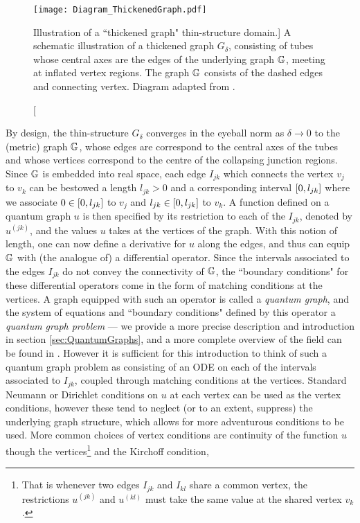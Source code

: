 \begin{figure}[t]
	\centering
	\texttt{[image: Diagram\_ThickenedGraph.pdf]}
	\caption[Illustration of a ``thickened graph" thin-structure domain.]{\label{fig:Diagram_ThickenedGraph} A schematic illustration of a thickened graph $G_{\delta}$, consisting of tubes whose central axes are the edges of the underlying graph $\mathbb{G}$, meeting at inflated vertex regions. The graph $\mathbb{G}$ consists of the dashed edges and connecting vertex. Diagram adapted from \cite[Figure 1]{exner2005convergence}.}
\end{figure}

By design, the thin-structure $G_{\delta}$ converges in the eyeball norm as $\delta\rightarrow0$ to the (metric) graph $\mathbb{G}$, whose edges are correspond to the central axes of the tubes and whose vertices correspond to the centre of the collapsing junction regions.
Since $\mathbb{G}$ is embedded into real space, each edge $I_{jk}$ which connects the vertex $v_j$ to $v_k$ can be bestowed a length $l_{jk}>0$ and a corresponding interval $\left[ 0,l_{jk} \right]$ where we associate $0\in\left[ 0,l_{jk} \right]$ to $v_j$ and $l_{jk}\in\left[ 0,l_{jk} \right]$ to $v_k$.
A function defined on a quantum graph $u$ is then specified by its restriction to each of the $I_{jk}$, denoted by $u^{(jk)}$, and the values $u$ takes at the vertices of the graph.
With this notion of length, one can now define a derivative for $u$ along the edges, and thus can equip $\mathbb{G}$ with (the analogue of) a differential operator.
Since the intervals associated to the edges $I_{jk}$ do not convey the connectivity of $\mathbb{G}$, the ``boundary conditions" for these differential operators come in the form of matching conditions at the vertices.
A graph equipped with such an operator is called a \emph{quantum graph}, and the system of equations and ``boundary conditions" defined by this operator a \emph{quantum graph problem} --- we provide a more precise description and introduction in section \ref{sec:QuantumGraphs}, and a more complete overview of the field can be found in \cite{berkolaiko2013introduction}.
However it is sufficient for this introduction to think of such a quantum graph problem as consisting of an ODE on each of the intervals associated to $I_{jk}$, coupled through matching conditions at the vertices.
Standard Neumann or Dirichlet conditions on $u$ at each vertex can be used as the vertex conditions, however these tend to neglect (or to an extent, suppress) the underlying graph structure, which allows for more adventurous conditions to be used.
More common choices of vertex conditions are continuity of the function $u$ though the vertices\footnote{That is whenever two edges $I_{jk}$ and $I_{kl}$ share a common vertex, the restrictions $u^{(jk)}$ and $u^{(kl)}$ must take the same value at the shared vertex $v_k$.} and the Kirchoff condition,
